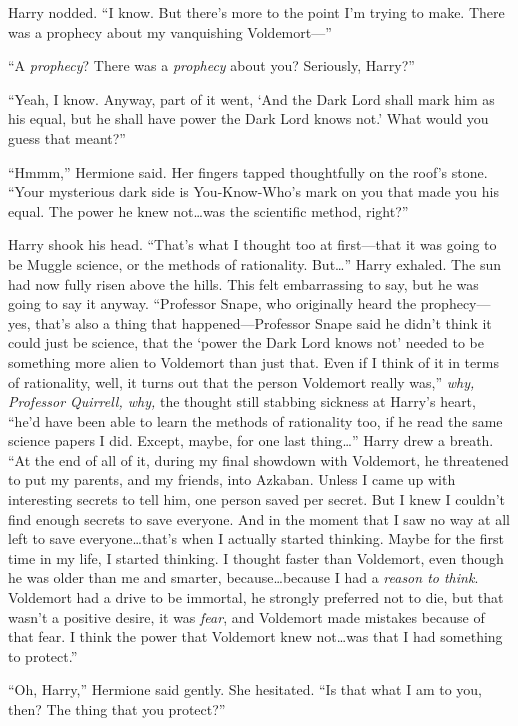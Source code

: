 Harry nodded. “I know. But there’s more to the point I’m trying to make. There was a prophecy about my vanquishing Voldemort—”

“A \emph{prophecy}? There was a \emph{prophecy} about you? Seriously, Harry?”

“Yeah, I know. Anyway, part of it went, ‘And the Dark Lord shall mark him as his equal, but he shall have power the Dark Lord knows not.’ What would you guess that meant?”

“Hmmm,” Hermione said. Her fingers tapped thoughtfully on the roof’s stone. “Your mysterious dark side is You-Know-Who’s mark on you that made you his equal. The power he knew not…was the scientific method, right?”

Harry shook his head. “That’s what I thought too at first—that it was going to be Muggle science, or the methods of rationality. But…” Harry exhaled. The sun had now fully risen above the hills. This felt embarrassing to say, but he was going to say it anyway. “Professor Snape, who originally heard the prophecy—yes, that’s also a thing that happened—Professor Snape said he didn’t think it could just be science, that the ‘power the Dark Lord knows not’ needed to be something more alien to Voldemort than just that. Even if I think of it in terms of rationality, well, it turns out that the person Voldemort really was,” \emph{why, Professor Quirrell, why,} the thought still stabbing sickness at Harry’s heart, “he’d have been able to learn the methods of rationality too, if he read the same science papers I did. Except, maybe, for one last thing…” Harry drew a breath. “At the end of all of it, during my final showdown with Voldemort, he threatened to put my parents, and my friends, into Azkaban. Unless I came up with interesting secrets to tell him, one person saved per secret. But I knew I couldn’t find enough secrets to save everyone. And in the moment that I saw no way at all left to save everyone…that’s when I actually started thinking. Maybe for the first time in my life, I started thinking. I thought faster than Voldemort, even though he was older than me and smarter, because…because I had a \emph{reason to think}. Voldemort had a drive to be immortal, he strongly preferred not to die, but that wasn’t a positive desire, it was \emph{fear}, and Voldemort made mistakes because of that fear. I think the power that Voldemort knew not…was that I had something to protect.”

“Oh, Harry,” Hermione said gently. She hesitated. “Is that what I am to you, then? The thing that you protect?”

